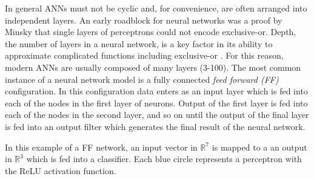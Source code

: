 \documentclass[10pt]{extarticle}
\newcommand{\R}{\mathbb{R}}
\newcommand{\e}{\varepsilon}
\newcounter{col}
\begin{document}


In general ANNs 
must not be cyclic and, for convenience, are often arranged into
independent layers. An early roadblock for neural networks was a proof by Minsky \cite{minsky1969perceptrons} that single layers of perceptrons could not encode exclusive-or. Depth, the number of layers in a neural network, is a key factor in its ability to approximate complicated functions including exclusive-or \cite{kak1993training}. For this reason, modern ANNs are usually composed of many layers (3-100). The most common instance of a neural network model is a fully connected \emph{feed forward (FF)} configuration. In this configuration data enters as an input layer which is fed into each of the nodes in the first layer of neurons. Output of the first layer is fed into each of the nodes in the second layer, and so on until the output of the final layer is fed into an output filter which generates the final result of the neural network. 




In this example of a FF network, an input vector in $\R^7$ is mapped to a
an output in $\R^3$ which is fed into a classifier. Each blue circle
represents a perceptron with the ReLU activation function. 

\end{document}
